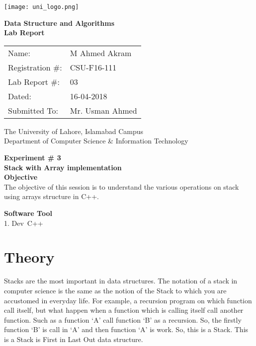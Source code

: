 \documentclass[11pt]{article}            %
\begin{document}
\begin{titlepage}
    \centering
  \vfill
    \texttt{[image: uni\_logo.png]} \\ 
	\vskip2cm
    {\bfseries\Large
	Data Structure and Algorithms \\ 
	
	\vskip2cm
	Lab Report 
	 
	\vskip2cm
	}    

\begin{center}
\begin{tabular}{ l l  } 

Name: & M Ahmed Akram \\ 
Registration \#: & CSU-F16-111 \\ 
Lab Report \#: & 03 \\ 
 Dated:& 16-04-2018\\ 
Submitted To:& Mr. Usman Ahmed\\ 

\end{tabular}
\end{center}
    \vfill
    The University of Lahore, Islamabad Campus\\
Department of Computer Science \& Information Technology
\end{titlepage}


    
    {\bfseries\Large
\centering
	Experiment \# 3 \\

Stack with Array implementation   \\
	
	}    
 \vskip1cm
 \textbf {Objective}\\  The objective of this session is to understand the various operations on stack using arrays structure in C++. 

 \textbf {Software Tool} \\
1.   Dev\ C++


\section{Theory }          
Stacks are the most important in data structures. The notation of a stack in computer science is the same as the notion of the Stack to which you are accustomed in everyday life. For example, a recursion program on which function call itself, but what happen when a function which is calling itself call another function. Such as a function ‘A’ call function ‘B’ as a recursion. So, the firstly function ‘B’ is call in ‘A’ and then function ‘A’ is work. So, this is a Stack. This is a Stack is First in Last Out data structure.      
\end{document}
